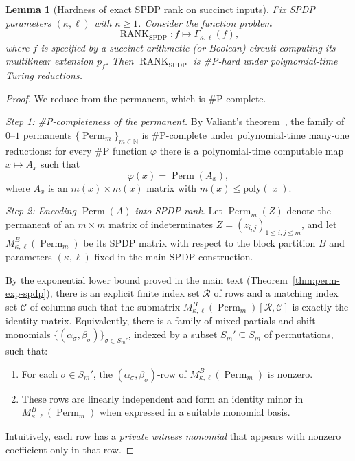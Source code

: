 \documentclass[12pt]{article}
\DeclareMathOperator{\Perm}{Perm}
\DeclareMathOperator{\RANK}{RANK}
\newtheorem{lemma}[theorem]{Lemma}
\theoremstyle{definition}
\theoremstyle{definition}
\theoremstyle{remark}
\theoremstyle{remark}
\begin{document}
\begin{lemma}[Hardness of exact SPDP rank on succinct inputs]
\label{lem:spdp-rank-hard}
Fix SPDP parameters $(\kappa,\ell)$ with $\kappa \ge 1$.
Consider the function problem
\[
  \RANK_{\mathrm{SPDP}} : f \longmapsto \Gamma_{\kappa,\ell}(f),
\]
where $f$ is specified by a succinct arithmetic (or Boolean) circuit computing its
multilinear extension $p_f$. Then $\RANK_{\mathrm{SPDP}}$ is \#P-hard under
polynomial-time Turing reductions.
\end{lemma}

\begin{proof}
We reduce from the permanent, which is \#P-complete.

\medskip\noindent
\emph{Step 1: \#P-completeness of the permanent.}
By Valiant's theorem~\cite{valiant1979}, the family of $0$--$1$ permanents
$\{\Perm_m\}_{m \in \mathbb{N}}$ is \#P-complete under polynomial-time many-one
reductions: for every \#P function $\varphi$ there is a polynomial-time computable map
$x \mapsto A_x$ such that
\[
  \varphi(x) = \Perm(A_x),
\]
where $A_x$ is an $m(x) \times m(x)$ matrix with $m(x) \le \mathrm{poly}(|x|)$.

\medskip\noindent
\emph{Step 2: Encoding $\Perm(A)$ into SPDP rank.}
Let $\Perm_m(Z)$ denote the permanent of an $m \times m$ matrix of indeterminates
$Z = (z_{i,j})_{1 \le i,j \le m}$, and let $M^{B}_{\kappa,\ell}(\Perm_m)$ be its SPDP matrix
with respect to the block partition $B$ and parameters $(\kappa,\ell)$ fixed in the main
SPDP construction.

By the exponential lower bound proved in the main text
(Theorem~\ref{thm:perm-exp-spdp}), there is an explicit finite index set $\mathcal{R}$ of
rows and a matching index set $\mathcal{C}$ of columns such that the submatrix
$M^{B}_{\kappa,\ell}(\Perm_m)[\mathcal{R},\mathcal{C}]$ is exactly the identity matrix. Equivalently,
there is a family of mixed partials and shift monomials
$\{(\alpha_\sigma,\beta_\sigma)\}_{\sigma \in S_m'}$, indexed by a subset
$S_m' \subseteq S_m$ of permutations, such that:
\begin{enumerate}
\item[(i)] For each $\sigma \in S_m'$, the $(\alpha_\sigma,\beta_\sigma)$-row of
  $M^{B}_{\kappa,\ell}(\Perm_m)$ is nonzero.
\item[(ii)] These rows are linearly independent and form an identity minor in
  $M^{B}_{\kappa,\ell}(\Perm_m)$ when expressed in a suitable monomial basis.
\end{enumerate}
Intuitively, each row has a \emph{private witness monomial} that appears with nonzero
coefficient only in that row.


\end{proof}
\end{document}
